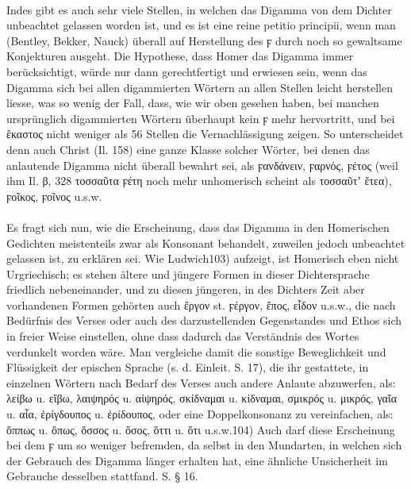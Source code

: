   \paragraph{} Indes gibt es auch
  sehr viele Stellen, in welchen das Digamma von dem Dichter unbeachtet gelassen
  worden ist, und es ist eine reine petitio principii, wenn man (Bentley,
  Bekker, Nauck) überall auf Herstellung des ϝ durch noch so gewaltsame
  Konjekturen ausgeht. Die Hypothese, dass Homer das Digamma immer
  berücksichtigt, würde nur dann gerechtfertigt und erwiesen sein, wenn das
  Digamma sich bei allen digammierten Wörtern an allen Stellen leicht herstellen
  liesse, was so wenig der Fall, dass, wie wir oben gesehen haben, bei manchen
  ursprünglich digammierten Wörtern überhaupt kein ϝ mehr hervortritt, und bei
  ἕκαστος nicht weniger als 56 Stellen die Vernachlässigung zeigen. So
  unterscheidet denn auch Christ (Il. 158) eine ganze Klasse solcher Wörter, bei
  denen das anlautende Digamma nicht überall bewahrt sei, als ϝανδάνειν, ϝαρνός,
  ϝέτος (weil ihm Il. β, 328 τοσσαῦτα ϝέτη noch mehr unhomerisch scheint als
  τοσσαῦτʼ ἔτεα), ϝοῖκος, ϝοῖνος u.s.w. 

  \paragraph{} Es fragt sich nun, wie die
  Erscheinung, dass das Digamma in den Homerischen Gedichten meistenteils zwar
  als Konsonant behandelt, zuweilen jedoch unbeachtet gelassen ist, zu erklären
  sei. Wie Ludwich103) aufzeigt, ist Homerisch eben nicht Urgriechisch; es
  stehen ältere und jüngere Formen in dieser Dichtersprache friedlich
  nebeneinander, und zu diesen jüngeren, in des Dichters Zeit aber vorhandenen
  Formen gehörten auch ἔργον st. ϝέργον, ἔπος, εἶδον u.s.w., die nach
  Bedürfnis des Verses oder auch des darzustellenden Gegenstandes und Ethos sich
  in freier Weise einstellen, ohne dass dadurch das Verständnis des Wortes
  verdunkelt worden wäre. Man vergleiche damit die sonstige Beweglichkeit und
  Flüssigkeit der epischen Sprache (s. d. Einleit. S. 17), die ihr gestattete,
  in einzelnen Wörtern nach Bedarf des Verses auch andere Anlaute abzuwerfen,
  als: λείβω u. εἴβω, λαιψηρός u. αἰψηρός, σκίδναμαι u. κίδναμαι, σμικρός u.
  μικρός, γαῖα u. αἶα, ἐρίγδουπος u. ἐρίδουπος, oder eine Doppelkonsonanz zu
  vereinfachen, als: ὅππως u. ὅπως, ὅσσος u. ὅσος, ὅττι u. ὅτι u.s.w.104) Auch
  darf diese Erscheinung bei dem ϝ um so weniger befremden, da selbst in den
  Mundarten, in welchen sich der Gebrauch des Digamma länger erhalten hat, eine
ähnliche Unsicherheit im Gebrauche desselben stattfand. S. § 16. 

